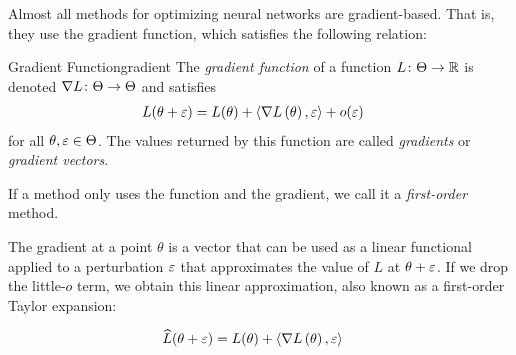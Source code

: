 \documentclass[../../thesis.tex]{subfiles}
\begin{document}
Almost all methods for optimizing neural networks
are gradient-based.
That is, they use the gradient function,
which satisfies the following relation:

\begin{definition}{Gradient Function}{gradient}
	The \emph{gradient function} of a function $L \colon \Theta \to \mathbb{R}$
	is denoted $\nabla{L} \colon \Theta \to \Theta$
	and satisfies
	\begin{align}
		&L(\theta + \eps) = L(\theta) + \langle\grad{L}{\theta},\eps\rangle + o(\eps)\equationlabel{grad-def}
	\end{align}
	for all $\theta, \varepsilon \in \Theta$.
	The values returned by this function are called \emph{gradients}
	or \emph{gradient vectors}.
\end{definition}
\noindent If a method only uses the function and the gradient,
we call it a \emph{first-order} method.

The gradient at a point $\theta$ is a vector that can be used
as a linear functional applied to a perturbation $\varepsilon$ that approximates
the value of $L$ at $\theta + \varepsilon$.
If we drop the little-$o$ term,
we obtain this linear approximation,
also known as a first-order Taylor expansion:

\begin{align}
	&\widehat{L}(\theta + \varepsilon) = L(\theta) + \langle\nabla L\left(\theta\right),\varepsilon\rangle
\end{align}
\end{document}
